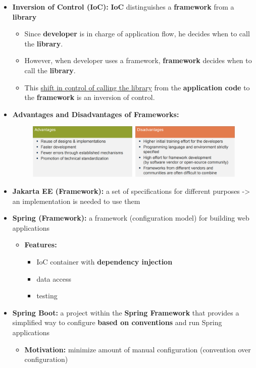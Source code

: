 \documentclass[ieeetran]{article}
\begin{document}
\begin{itemize}
\item \textbf{Inversion of Control (IoC):} \textbf{IoC} distinguishes a \textbf{framework} from a \textbf{library}
\begin{itemize}
	\item Since \textbf{developer} is in charge of application flow, he decides when to call the \textbf{library}. 
\item  However, when developer uses a framework, \textbf{framework} decides when to call the \textbf{library}.
\item This \underline{shift in control of calling the library} from the \textbf{application code} to the \textbf{framework} is an inversion of control.

\end{itemize}

\pagebreak

\item \textbf{Advantages and Disadvantages of Frameworks:}
	\begin{figure}[h!]
	  \centering
	  \includegraphics[width=1.0\linewidth]{addisframe.png}
	  \label{fig:addisframe_png}
	\end{figure}


\item \textbf{Jakarta EE (Framework):} a set of specifications for different purposes -> an implementation is needed to use them

\item \textbf{Spring (Framework):} a framework (configuration model) for building web applications
\begin{itemize}
  \item \textbf{Features:}
	  \begin{itemize}
	    \item IoC container with \textbf{dependency injection}
	\item data access
	\item testing
	  \end{itemize}
\end{itemize}

\item \textbf{Spring Boot:} a project within the \textbf{Spring Framework} that provides a simplified way to configure \textbf{based on conventions} and run Spring applications
	\begin{itemize}
	  \item \textbf{Motivation:} minimize amount of manual configuration (convention over configuration)


\end{itemize}
\end{itemize}
\end{document}
